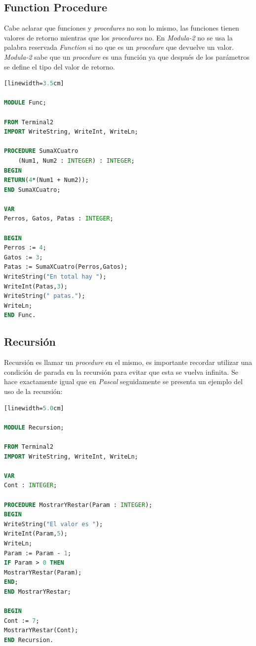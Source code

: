 \documentclass[10pt,journal,compsoc]{IEEEtran}
\begin{document}
\subsection{Function Procedure}
Cabe aclarar que funciones y \emph{procedures} no son lo mismo, las funciones tienen valores de retorno mientras que los \emph{procedures} no.
En \emph{Modula-2} no se usa la palabra reservada \emph{Function} si no que es un \emph{procedure} que devuelve un valor. \emph{Modula-2} sabe que un \emph{procedure} es una funci\'on ya que despu\'es de los par\'ametros se define el tipo del valor de retorno.
\begin{lstlisting}[language=Modula-2, caption = {Sintaxis de una funci\'on}][linewidth=3.5cm]

MODULE Func;

FROM Terminal2 
IMPORT WriteString, WriteInt, WriteLn;

PROCEDURE SumaXCuatro
	(Num1, Num2 : INTEGER) : INTEGER;
BEGIN
RETURN(4*(Num1 + Num2));
END SumaXCuatro;

VAR 
Perros, Gatos, Patas : INTEGER;

BEGIN  
Perros := 4;
Gatos := 3;
Patas := SumaXCuatro(Perros,Gatos);
WriteString("En total hay ");
WriteInt(Patas,3);
WriteString(" patas.");
WriteLn;
END Func.

\end{lstlisting}

\subsection{Recursi\'on}
Recursi\'on es llamar un \emph{procedure} en el mismo, es importante recordar utilizar una condici\'on de parada en la recursi\'on para evitar que esta se vuelva infinita. Se hace exactamente igual que en \emph{Pascal} seguidamente se presenta un ejemplo del uso de la recursi\'on:
\begin{lstlisting}[language=Modula-2, caption = {Recursi\'on en Modula-2}][linewidth=5.0cm]

MODULE Recursion;

FROM Terminal2 
IMPORT WriteString, WriteInt, WriteLn;

VAR 
Cont : INTEGER;

PROCEDURE MostrarYRestar(Param : INTEGER);
BEGIN
WriteString("El valor es ");
WriteInt(Param,5);
WriteLn;
Param := Param - 1;
IF Param > 0 THEN
MostrarYRestar(Param);
END;
END MostrarYRestar;

BEGIN    
Cont := 7;
MostrarYRestar(Cont);
END Recursion.

\end{lstlisting}
\end{document}
